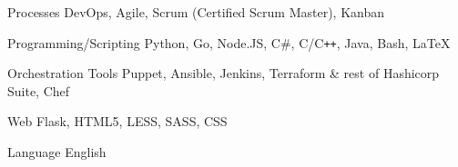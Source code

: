

\begin{cvskills}

	\cvskill
	{Processes} %
	{DevOps, Agile, Scrum (Certified Scrum Master), Kanban} %

	\cvskill
	{Programming/Scripting} %
	{Python, Go, Node.JS, C\#, C/C\texttt{++}, Java, Bash, LaTeX} %

	\cvskill
	{Orchestration Tools}
	{Puppet, Ansible, Jenkins, Terraform \& rest of Hashicorp Suite, Chef}

	\cvskill
	{Web} %
	{Flask, HTML5, LESS, SASS, CSS} %

	\cvskill
	{Language} %
	{English} %

\end{cvskills}
